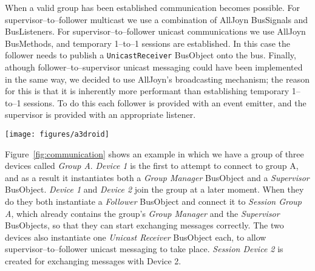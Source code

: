 When a valid group has been established communication becomes possible. For supervisor--to--follower multicast we use a combination of AllJoyn BusSignals and BusListeners. For supervisor--to--follower unicast communications we use AllJoyn BusMethods, and temporary 1--to--1 sessions are established. In this case the follower needs to publish a \texttt{UnicastReceiver} BusObject onto the bus. Finally, athough follower--to--supervisor unicast messaging could have been implemented in the same way, we decided to use AllJoyn's broadcasting mechanism; the reason for this is that it is inherently more performant than establishing temporary 1--to--1 sessions. To do this each follower is provided with an event emitter, and the supervisor is provided with an appropriate listener.

\begin{figure*}[t!]
\centering
\texttt{[image: figures/a3droid]}
\caption{A3Droid uses AllJoyn for node communication.}
\label{fig:communication}
\end{figure*}

Figure~\ref{fig:communication} shows an example in which we have a group of three devices called \emph{Group A}. \emph{Device 1} is the first to attempt to connect to group A, and as a result it instantiates both a \emph{Group Manager} BusObject and a \emph{Supervisor} BusObject. \emph{Device 1} and \emph{Device 2} join the group at a later moment. When they do they both instantiate a \emph{Follower} BusObject and connect it to \emph{Session Group A}, which already contains the group's \emph{Group Manager} and the \emph{Supervisor} BusObjects, so that they can start exchanging messages correctly. The two devices also instantiate one \emph{Unicast Receiver} BusObject each, to allow supervisor--to--follower unicast messaging to take place. \emph{Session Device 2} is created for exchanging messages with Device 2.














